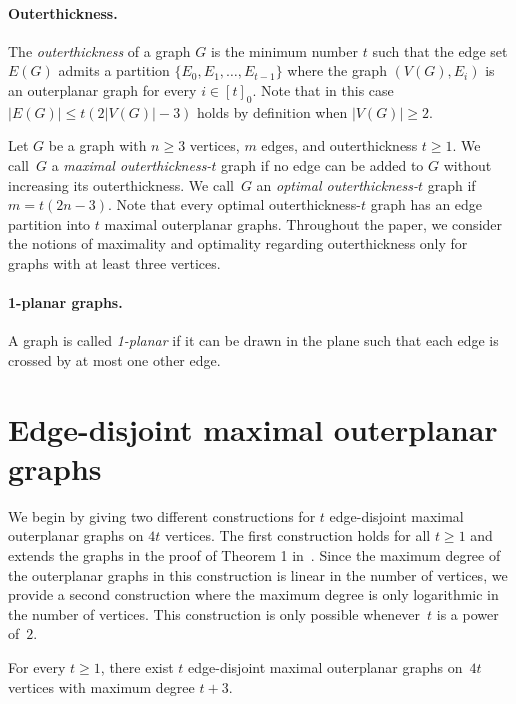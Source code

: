 \documentclass[unicode,runningheads,envcountsame,a4paper,dvipsnames,12pt]{llncs}
\begin{document}
	\paragraph{Outerthickness.}
	
	The \emph{outerthickness} of a graph $G$ is the minimum number $t$ such that the edge set $E(G)$ admits a partition $\{E_0, E_1, \dots, E_{t-1}\}$ where the graph $(V(G), E_i)$ is an outerplanar graph for every $i \in [t]_0$.
	Note that in this case~$|E(G)| \leq t (2 |V(G)| - 3)$ holds by definition when $|V(G)| \geq 2$.
	
	Let $G$ be a graph with $n \geq 3$ vertices, $m$ edges, and outerthickness $t \geq 1$.
	We call~$G$ a \emph{maximal outerthickness-$t$} graph if no edge can be added to $G$ without increasing its outerthickness.
	We call~$G$ an \emph{optimal outerthickness-$t$} graph if $m = t (2n-3)$.
	Note that every optimal outerthickness-\(t\) graph has an edge partition into \(t\) maximal outerplanar graphs. Throughout the paper, we consider the notions of maximality and optimality regarding outerthickness only for graphs with at least three vertices.

	\paragraph{1-planar graphs.} A graph is called \textit{1-planar} if it can be drawn in the plane such that each edge is crossed by at most one other edge.

	\section{Edge-disjoint maximal outerplanar graphs}
	\label{sec:edge-dis-max-out-plan}
	
	We begin by giving two different constructions for \(t\) edge-disjoint maximal outerplanar graphs on \(4t\) vertices. The first construction holds for all \(t \geq 1\) and extends the graphs in the proof of Theorem 1 in~\cite{Guy1990}. Since the maximum degree of the outerplanar graphs in this construction is linear in the number of vertices, we provide a second construction where the maximum degree is only logarithmic in the number of vertices. This construction is only possible whenever~\(t\) is a power of~$2$.
		
	\begin{lemma}
		\label{lem:optimal-ot-construct}
		For every $t \geq 1$, there exist \(t\) edge-disjoint maximal outerplanar graphs on~$4t$ vertices with maximum degree \(t+3\).
	\end{lemma}
	
\end{document}
